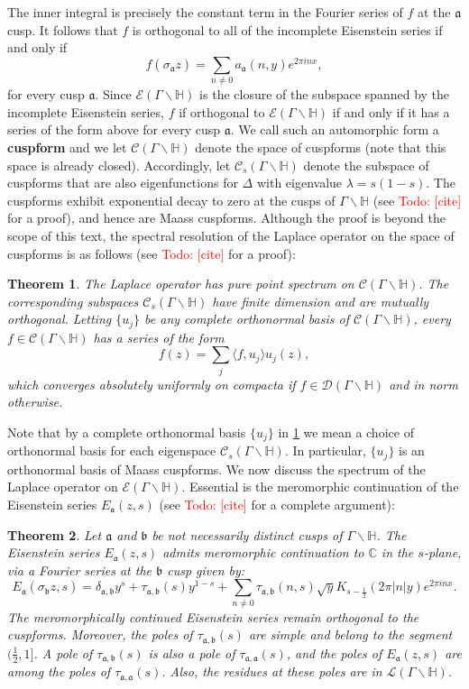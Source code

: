 \documentclass[12pt]{book}
\newtheorem{theorem}{Theorem}[section]
\theoremstyle{definition}\newframedtheorem{method}{Method}
\newcommand{\mf}{\mathfrak}
\newcommand{\mc}{\mathcal}
\newcommand{\C}{\mathbb{C}}
\renewcommand{\H}{\mathbb{H}}
\renewcommand{\d}{\delta}
\renewcommand{\l}{\lambda}
\newcommand{\s}{\sigma}
\newcommand{\G}{\Gamma}
\newcommand{\D}{\Delta}
\newcommand{\<}{\langle}
\renewcommand{\>}{\rangle}
\newcommand{\GH}{\G\backslash\H}
\newcommand{\todo}[1]{\textcolor{red}{\sf Todo: [#1]}}
\begin{document}
      The inner integral is precisely the constant term in the Fourier series of $f$ at the $\mf{a}$ cusp. It follows that $f$ is orthogonal to all of the incomplete Eisenstein series if and only if
      \[
        f(\s_{\mf{a}}z) = \sum_{n \neq 0}a_{\mf{a}}(n,y)e^{2\pi inx},
      \]
      for every cusp $\mf{a}$. Since $\mc{E}(\GH)$ is the closure of the subspace spanned by the incomplete Eisenstein series, $f$ if orthogonal to $\mc{E}(\GH)$ if and only if it has a series of the form above for every cusp $\mf{a}$. We call such an automorphic form a \textbf{cuspform} and we let $\mc{C}(\GH)$ denote the space of cuspforms (note that this space is already closed). Accordingly, let $\mc{C}_{s}(\GH)$ denote the subspace of cuspforms that are also eigenfunctions for $\D$ with eigenvalue $\l = s(1-s)$. The cuspforms exhibit exponential decay to zero at the cusps of $\GH$ (see \todo{cite} for a proof), and hence are Maass cuspforms. Although the proof is beyond the scope of this text, the spectral resolution of the Laplace operator on the space of cuspforms is as follows (see \todo{cite} for a proof):

      \begin{theorem}\label{thm:cusp_form_spectrum}
        The Laplace operator has pure point spectrum on $\mc{C}(\GH)$. The corresponding subspaces $\mc{C}_{s}(\GH)$ have finite dimension and are mutually orthogonal. Letting $\{u_{j}\}$ be any complete orthonormal basis of $\mc{C}(\GH)$, every $f \in \mc{C}(\GH)$ has a series of the form
        \[
          f(z) = \sum_{j}\<f,u_{j}\>u_{j}(z),
        \]
        which converges absolutely uniformly on compacta if $f \in \mc{D}(\GH)$ and in norm otherwise.
      \end{theorem}

       Note that by a complete orthonormal basis $\{u_{j}\}$ in \cref{thm:cusp_form_spectrum} we mean a choice of orthonormal basis for each eigenspace $\mc{C}_{s}(\GH)$. In particular, $\{u_{j}\}$ is an orthonormal basis of Maass cuspforms. We now discuss the spectrum of the Laplace operator on $\mc{E}(\GH)$. Essential is the meromorphic continuation of the Eisenstein series $E_{\mf{a}}(z,s)$ (see \todo{cite} for a complete argument):

      \begin{theorem}\label{thm:meromorphic_continuation_of_Eisenstein_series}
        Let $\mf{a}$ and $\mf{b}$ be not necessarily distinct cusps of $\GH$. The Eisenstein series $E_{\mf{a}}(z,s)$ admits meromorphic continuation to $\C$ in the $s$-plane, via a Fourier series at the $\mf{b}$ cusp given by:
        \[
          E_{\mf{a}}(\s_{\mf{b}}z,s) = \d_{\mf{a},\mf{b}}y^{s}+\tau_{\mf{a},\mf{b}}(s)y^{1-s}+\sum_{n \neq 0}\tau_{\mf{a},\mf{b}}(n,s)\sqrt{y}K_{s-\frac{1}{2}}(2\pi|n|y)e^{2\pi inx}.
        \]
        The meromorphically continued Eisenstein series remain orthogonal to the cuspforms. Moreover, the poles of $\tau_{\mf{a},\mf{b}}(s)$ are simple and belong to the segment $(\frac{1}{2},1]$. A pole of $\tau_{\mf{a},\mf{b}}(s)$ is also a pole of $\tau_{\mf{a},\mf{a}}(s)$, and the poles of $E_{\mf{a}}(z,s)$ are among the poles of $\tau_{\mf{a},\mf{a}}(s)$. Also, the residues at these poles are in $\mc{L}(\GH)$.
      \end{theorem}
\end{document}
